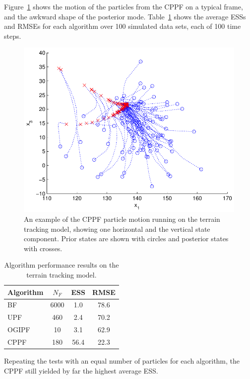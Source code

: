 \documentclass[conference]{IEEEtran}
\begin{document}
Figure~\ref{fig:drone_example_frame} shows the motion of the particles from the CPPF on a typical frame, and the awkward shape of the posterior mode. Table~\ref{tab:drone_results_gaussian} shows the average ESSs and RMSEs for each algorithm over 100 simulated data sets, each of 100 time steps.
%
\begin{figure}
\centering
\includegraphics[width=0.7\columnwidth]{drone_example_frame_deter.pdf}
\caption{An example of the CPPF particle motion running on the terrain tracking model, showing one horizontal and the vertical state component. Prior states are shown with circles and posterior states with crosses.}
\label{fig:drone_example_frame}
\end{figure}
%
\begin{table}
\renewcommand{\arraystretch}{1.3}
\centering
\caption{Algorithm performance results on the terrain tracking model.}
\begin{tabular}{l||c|c|c}
Algorithm                                & $N_F$ & ESS  & RMSE \\
\hline
BF                                       &  6000 &  1.0 & 78.6 \\
UPF                                      &   460 &  2.4 & 70.2 \\
OGIPF                                    &    10 &  3.1 & 62.9 \\
CPPF                                     &   180 & 56.4 & 22.3 \\
\end{tabular}
\label{tab:drone_results_gaussian}
\end{table}

Repeating the tests with an equal number of particles for each algorithm, the CPPF still yielded by far the highest average ESS.
\end{document}
